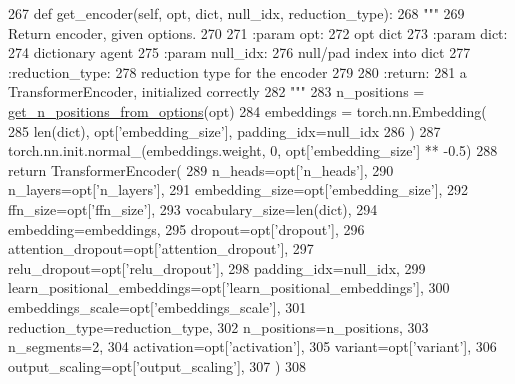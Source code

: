 \begin{DoxyCode}
267     \textcolor{keyword}{def }get\_encoder(self, opt, dict, null\_idx, reduction\_type):
268         \textcolor{stringliteral}{"""}
269 \textcolor{stringliteral}{        Return encoder, given options.}
270 \textcolor{stringliteral}{}
271 \textcolor{stringliteral}{        :param opt:}
272 \textcolor{stringliteral}{            opt dict}
273 \textcolor{stringliteral}{        :param dict:}
274 \textcolor{stringliteral}{            dictionary agent}
275 \textcolor{stringliteral}{        :param null\_idx:}
276 \textcolor{stringliteral}{            null/pad index into dict}
277 \textcolor{stringliteral}{        :reduction\_type:}
278 \textcolor{stringliteral}{            reduction type for the encoder}
279 \textcolor{stringliteral}{}
280 \textcolor{stringliteral}{        :return:}
281 \textcolor{stringliteral}{            a TransformerEncoder, initialized correctly}
282 \textcolor{stringliteral}{        """}
283         n\_positions = \hyperlink{namespaceparlai_1_1agents_1_1transformer_1_1modules_ab67607512c597ddd54f2b60a1a1eaf4c}{get\_n\_positions\_from\_options}(opt)
284         embeddings = torch.nn.Embedding(
285             len(dict), opt[\textcolor{stringliteral}{'embedding\_size'}], padding\_idx=null\_idx
286         )
287         torch.nn.init.normal\_(embeddings.weight, 0, opt[\textcolor{stringliteral}{'embedding\_size'}] ** -0.5)
288         \textcolor{keywordflow}{return} TransformerEncoder(
289             n\_heads=opt[\textcolor{stringliteral}{'n\_heads'}],
290             n\_layers=opt[\textcolor{stringliteral}{'n\_layers'}],
291             embedding\_size=opt[\textcolor{stringliteral}{'embedding\_size'}],
292             ffn\_size=opt[\textcolor{stringliteral}{'ffn\_size'}],
293             vocabulary\_size=len(dict),
294             embedding=embeddings,
295             dropout=opt[\textcolor{stringliteral}{'dropout'}],
296             attention\_dropout=opt[\textcolor{stringliteral}{'attention\_dropout'}],
297             relu\_dropout=opt[\textcolor{stringliteral}{'relu\_dropout'}],
298             padding\_idx=null\_idx,
299             learn\_positional\_embeddings=opt[\textcolor{stringliteral}{'learn\_positional\_embeddings'}],
300             embeddings\_scale=opt[\textcolor{stringliteral}{'embeddings\_scale'}],
301             reduction\_type=reduction\_type,
302             n\_positions=n\_positions,
303             n\_segments=2,
304             activation=opt[\textcolor{stringliteral}{'activation'}],
305             variant=opt[\textcolor{stringliteral}{'variant'}],
306             output\_scaling=opt[\textcolor{stringliteral}{'output\_scaling'}],
307         )
308 
\end{DoxyCode}
\mbox{\label{classparlai_1_1agents_1_1transformer_1_1polyencoder_1_1PolyEncoderModule_a52218a8c0594ff4d5bf8e666dc38f508}} 
